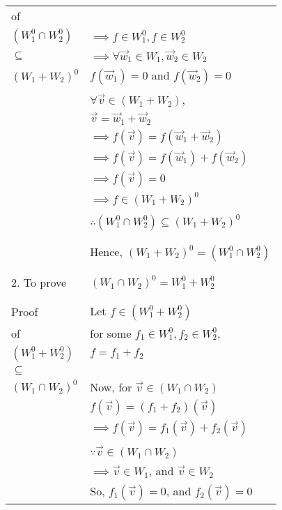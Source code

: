 \documentclass[journal,12pt]{IEEEtran}
\begin{document}
\begin{longtable}{|l|l|}
        of & \\
        $(W_1^0 \cap W_2^0)$ & $\implies f \in W_1^0, f \in W_2^0$\\
        $\subseteq$ & $\implies \forall \vec{w}_1 \in W_1, \vec{w}_2 \in W_2$\\
        $(W_1 + W_2)^0$ & $f(\vec{w}_1) = 0$ and $f(\vec{w}_2) = 0$\\
        & \\
        & $\forall \vec{v} \in (W_1+W_2),$\\
    \hline
        & $\vec{v} = \vec{w}_1 + \vec{w}_2$\\
        & $\implies f(\vec{v}) = f(\vec{w}_1 + \vec{w}_2)$\\
        & $\implies f(\vec{v}) = f(\vec{w}_1) + f(\vec{w}_2)$\\
        & $\implies f(\vec{v}) = 0$\\
        & $\implies f \in (W_1 + W_2)^0$\\
        & \\
        & $\therefore (W_1^0 \cap W_2^0) \subseteq (W_1 + W_2)^0$\\
        & \\
    \hline
        & \\
        & Hence, $(W_1 + W_2)^0 = (W_1^0 \cap W_2^0)$\\
        & \\
    \hline
        & \\
        2. To prove & $(W_1 \cap W_2)^0 = W_1^0 + W_2^0$\\
        & \\
    \hline
        & \\
        Proof & Let $f \in (W_1^0 + W_2^0)$\\
        of & for some $f_1 \in W_1^0, f_2 \in W_2^0$,\\
        $(W_1^0 + W_2^0)$ & $f = f_1 + f_2$\\
        $\subseteq$ & \\
        $(W_1 \cap W_2)^0$ & Now, for $\vec{v} \in (W_1 \cap W_2)$\\
        & $f(\vec{v}) = (f_1 + f_2)(\vec{v})$\\
        & $\implies f(\vec{v}) = f_1(\vec{v}) + f_2(\vec{v})$\\
        & \\
        & $\because \vec{v} \in (W_1 \cap W_2)$\\
        & $\implies \vec{v} \in W_1$, and $\vec{v} \in W_2$\\
        & So, $f_1(\vec{v}) = 0$, and $f_2(\vec{v}) = 0$\\

\end{longtable}
\end{document}

